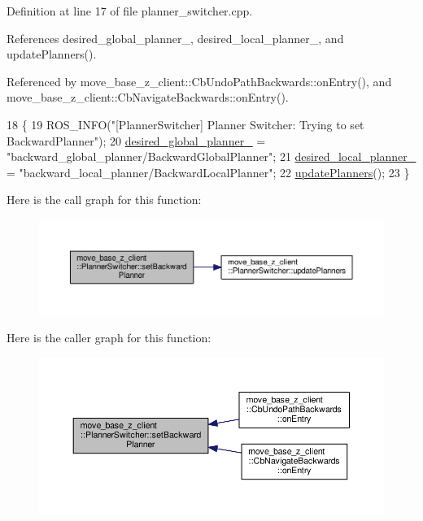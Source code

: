 Definition at line 17 of file planner\+\_\+switcher.\+cpp.



References desired\+\_\+global\+\_\+planner\+\_\+, desired\+\_\+local\+\_\+planner\+\_\+, and update\+Planners().



Referenced by move\+\_\+base\+\_\+z\+\_\+client\+::\+Cb\+Undo\+Path\+Backwards\+::on\+Entry(), and move\+\_\+base\+\_\+z\+\_\+client\+::\+Cb\+Navigate\+Backwards\+::on\+Entry().


\begin{DoxyCode}
18 \{
19   ROS\_INFO(\textcolor{stringliteral}{"[PlannerSwitcher] Planner Switcher: Trying to set BackwardPlanner"});
20   \hyperlink{classmove__base__z__client_1_1PlannerSwitcher_a004c15858f0a6b9abcd8211d58a7e34c}{desired\_global\_planner\_} = \textcolor{stringliteral}{"backward\_global\_planner/BackwardGlobalPlanner"};
21   \hyperlink{classmove__base__z__client_1_1PlannerSwitcher_ae47bd6c9c70b27cddcb394f26bb9372d}{desired\_local\_planner\_} = \textcolor{stringliteral}{"backward\_local\_planner/BackwardLocalPlanner"};
22   \hyperlink{classmove__base__z__client_1_1PlannerSwitcher_a189ac8c027169a111c7d8e14d864752f}{updatePlanners}();
23 \}
\end{DoxyCode}


Here is the call graph for this function\+:\nopagebreak
\begin{figure}[H]
\begin{center}
\leavevmode
\includegraphics[width=350pt]{classmove__base__z__client_1_1PlannerSwitcher_a7688616d66fbfe6486c0cbe77e688114_cgraph}
\end{center}
\end{figure}




Here is the caller graph for this function\+:\nopagebreak
\begin{figure}[H]
\begin{center}
\leavevmode
\includegraphics[width=350pt]{classmove__base__z__client_1_1PlannerSwitcher_a7688616d66fbfe6486c0cbe77e688114_icgraph}
\end{center}
\end{figure}


